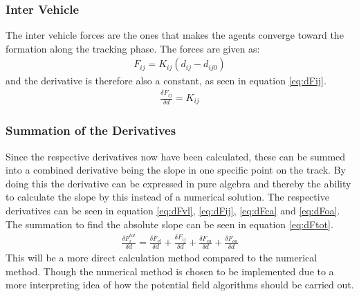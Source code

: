 \subsubsection{Inter Vehicle}
The inter vehicle forces are the ones that makes the agents converge toward the formation along the tracking phase. The forces are given as:
\begin{align}
F_{ij} = K_{ij}(d_{ij}-d_{ij0})
\end{align}
and the derivative is therefore also a constant, as seen in equation \ref{eq:dFij}.
\begin{align}
\frac{\delta F_{ij}}{\delta d} = K_{ij}
\label{eq:dFij}
\end{align}

\subsubsection{Summation of the Derivatives}
Since the respective derivatives now have been calculated, these can be summed into a combined derivative being the slope in one specific point on the track. By doing this the derivative can be expressed in pure algebra and thereby the ability to calculate the slope by this instead of a numerical solution. The respective derivatives can be seen in equation \ref{eq:dFvl}, \ref{eq:dFij}, \ref{eq:dFca} and \ref{eq:dFoa}. The summation to find the absolute slope can be seen in equation \ref{eq:dFtot}.
\begin{align}
\frac{\delta F^{tot}_{i}}{\delta d} = \frac{\delta F_{vl}}{\delta d} + \frac{\delta F_{ij}}{\delta d} + \frac{\delta F_{ca}}{\delta d} + \frac{\delta F_{oa}}{\delta d}
\label{eq:dFtot}
\end{align}
This will be a more direct calculation method compared to the numerical method. Though the numerical method is chosen to be implemented due to a more interpreting idea of how the potential field algorithms should be carried out.


